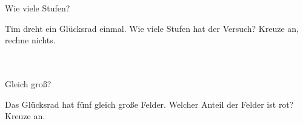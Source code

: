 \setcounter{aufgabe}{10}

\begin{aufgabe}{Wie viele Stufen?}
\begin{teile}
\teil Tim dreht ein Glücksrad einmal. Wie viele Stufen hat der Versuch? Kreuze an, rechne nichts. \\  \\  \\ 
\end{teile}
\end{aufgabe}

\begin{aufgabe}{Gleich groß?}
\begin{teile}
\teil Das Glücksrad hat fünf gleich große Felder. Welcher Anteil der Felder ist rot? Kreuze an. \\  \\ 
\end{teile}
\end{aufgabe}

